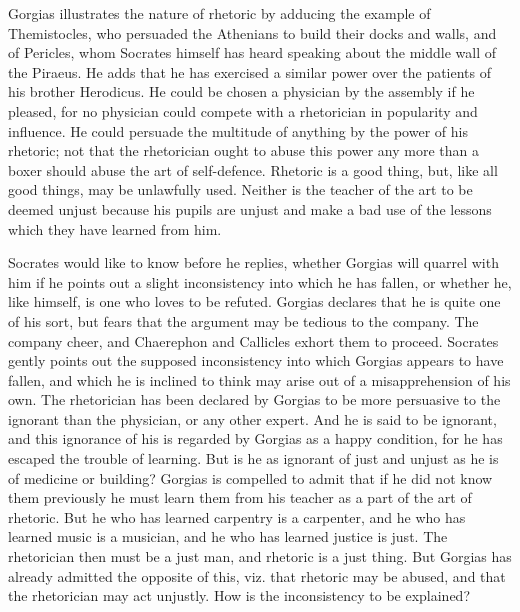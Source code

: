 \documentclass[11pt,letter]{article}
\begin{document}
\par  Gorgias illustrates the nature of rhetoric by adducing the example of Themistocles, who persuaded the Athenians to build their docks and walls, and of Pericles, whom Socrates himself has heard speaking about the middle wall of the Piraeus. He adds that he has exercised a similar power over the patients of his brother Herodicus. He could be chosen a physician by the assembly if he pleased, for no physician could compete with a rhetorician in popularity and influence. He could persuade the multitude of anything by the power of his rhetoric; not that the rhetorician ought to abuse this power any more than a boxer should abuse the art of self-defence. Rhetoric is a good thing, but, like all good things, may be unlawfully used. Neither is the teacher of the art to be deemed unjust because his pupils are unjust and make a bad use of the lessons which they have learned from him.

\par  Socrates would like to know before he replies, whether Gorgias will quarrel with him if he points out a slight inconsistency into which he has fallen, or whether he, like himself, is one who loves to be refuted. Gorgias declares that he is quite one of his sort, but fears that the argument may be tedious to the company. The company cheer, and Chaerephon and Callicles exhort them to proceed. Socrates gently points out the supposed inconsistency into which Gorgias appears to have fallen, and which he is inclined to think may arise out of a misapprehension of his own. The rhetorician has been declared by Gorgias to be more persuasive to the ignorant than the physician, or any other expert. And he is said to be ignorant, and this ignorance of his is regarded by Gorgias as a happy condition, for he has escaped the trouble of learning. But is he as ignorant of just and unjust as he is of medicine or building? Gorgias is compelled to admit that if he did not know them previously he must learn them from his teacher as a part of the art of rhetoric. But he who has learned carpentry is a carpenter, and he who has learned music is a musician, and he who has learned justice is just. The rhetorician then must be a just man, and rhetoric is a just thing. But Gorgias has already admitted the opposite of this, viz. that rhetoric may be abused, and that the rhetorician may act unjustly. How is the inconsistency to be explained?
\end{document}

